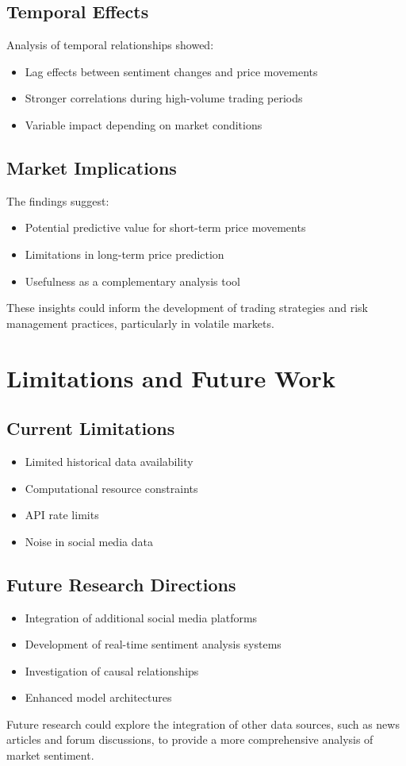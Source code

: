 \documentclass[12pt,a4paper]{report}
\begin{document}
\section{Temporal Effects}
Analysis of temporal relationships showed:
\begin{itemize}
    \item Lag effects between sentiment changes and price movements
    \item Stronger correlations during high-volume trading periods
    \item Variable impact depending on market conditions
\end{itemize}

\section{Market Implications}
The findings suggest:
\begin{itemize}
    \item Potential predictive value for short-term price movements
    \item Limitations in long-term price prediction
    \item Usefulness as a complementary analysis tool
\end{itemize}
These insights could inform the development of trading strategies and risk management practices, particularly in volatile markets.

\chapter{Limitations and Future Work}
\section{Current Limitations}
\begin{itemize}
    \item Limited historical data availability
    \item Computational resource constraints
    \item API rate limits
    \item Noise in social media data
\end{itemize}

\section{Future Research Directions}
\begin{itemize}
    \item Integration of additional social media platforms
    \item Development of real-time sentiment analysis systems
    \item Investigation of causal relationships
    \item Enhanced model architectures
\end{itemize}
Future research could explore the integration of other data sources, such as news articles and forum discussions, to provide a more comprehensive analysis of market sentiment.
\end{document}

